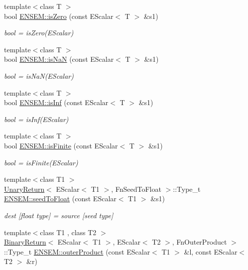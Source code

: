 \begin{DoxyCompactItemize}
{\footnotesize template$<$class T $>$ }\\bool \mbox{\hyperlink{group__escalar_ga114fe2eec1be253ca86ecb5290d189fc}{E\+N\+S\+E\+M\+::is\+Zero}} (const E\+Scalar$<$ T $>$ \&s1)
\begin{DoxyCompactList}\small\item\em bool = is\+Zero(\+E\+Scalar) \end{DoxyCompactList}\item 
{\footnotesize template$<$class T $>$ }\\bool \mbox{\hyperlink{group__escalar_gada6bc3d89f9c0b0dc55465bdcbb35a78}{E\+N\+S\+E\+M\+::is\+NaN}} (const E\+Scalar$<$ T $>$ \&s1)
\begin{DoxyCompactList}\small\item\em bool = is\+Na\+N(\+E\+Scalar) \end{DoxyCompactList}\item 
{\footnotesize template$<$class T $>$ }\\bool \mbox{\hyperlink{group__escalar_ga323a3743d3621a1c631ad3e52b85acba}{E\+N\+S\+E\+M\+::is\+Inf}} (const E\+Scalar$<$ T $>$ \&s1)
\begin{DoxyCompactList}\small\item\em bool = is\+Inf(\+E\+Scalar) \end{DoxyCompactList}\item 
{\footnotesize template$<$class T $>$ }\\bool \mbox{\hyperlink{group__escalar_ga70fcd41007f852c6b90539df7b80af87}{E\+N\+S\+E\+M\+::is\+Finite}} (const E\+Scalar$<$ T $>$ \&s1)
\begin{DoxyCompactList}\small\item\em bool = is\+Finite(\+E\+Scalar) \end{DoxyCompactList}\item 
{\footnotesize template$<$class T1 $>$ }\\\mbox{\hyperlink{structUnaryReturn}{Unary\+Return}}$<$ E\+Scalar$<$ T1 $>$, Fn\+Seed\+To\+Float $>$\+::Type\+\_\+t \mbox{\hyperlink{group__escalar_ga7e479d7cf5ca7620a11e78b407b2e9c3}{E\+N\+S\+E\+M\+::seed\+To\+Float}} (const E\+Scalar$<$ T1 $>$ \&s1)
\begin{DoxyCompactList}\small\item\em dest \mbox{[}float type\mbox{]} = source \mbox{[}seed type\mbox{]} \end{DoxyCompactList}\item 
{\footnotesize template$<$class T1 , class T2 $>$ }\\\mbox{\hyperlink{structBinaryReturn}{Binary\+Return}}$<$ E\+Scalar$<$ T1 $>$, E\+Scalar$<$ T2 $>$, Fn\+Outer\+Product $>$\+::Type\+\_\+t \mbox{\hyperlink{group__escalar_gaf54c1015e882e21da36323ae571504dc}{E\+N\+S\+E\+M\+::outer\+Product}} (const E\+Scalar$<$ T1 $>$ \&l, const E\+Scalar$<$ T2 $>$ \&r)

\end{DoxyCompactItemize}
